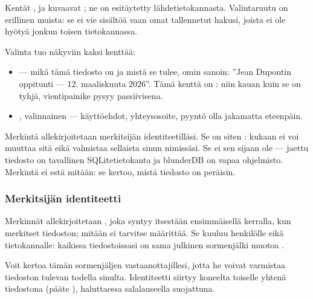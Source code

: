 \documentclass[letterpaper,10pt,finnish]{sphinxmanual}
\begin{document}
\sphinxAtStartPar
Kentät ,  ja  kuvaavat ; ne on esitäytetty lähdetietokannasta. Valintaruutu  on erillinen muista: se ei vie sisältöä vaan omat tallennetut hakusi, joista ei ole hyötyä jonkun toisen tietokannassa.

\sphinxAtStartPar
Valinta  tuo näkyviin kaksi kenttää:
\begin{itemize}
\item {} 
\sphinxAtStartPar
{} — mikä tämä tiedosto on ja mistä se tulee, omin sanoin: ”Jean Dupontin oppitunti — 12. maaliskuuta 2026”. Tämä kenttä on : niin kauan kuin se on tyhjä, vientipainike pysyy passiivisena.

\item {} 
\sphinxAtStartPar
{}, valinnainen — käyttöehdot, yhteysosoite, pyyntö olla jakamatta eteenpäin.

\end{itemize}

\sphinxAtStartPar
Merkintä allekirjoitetaan merkitsijän identiteetilläsi. Se on siten : kukaan ei voi muuttaa sitä eikä valmistaa sellaista sinun nimissäsi. Se ei sen sijaan ole  — jaettu tiedosto on tavallinen SQLite\sphinxhyphen{}tietokanta ja blunderDB on vapaa ohjelmisto. Merkintä ei estä mitään: se kertoo, mistä tiedosto on peräisin.


\subsubsection{Merkitsijän identiteetti}
\label{\detokenize{manuel:identite-d-emetteur}}
\sphinxAtStartPar
Merkinnät allekirjoitetaan , joka syntyy itsestään ensimmäisellä kerralla, kun merkitset tiedoston; mitään ei tarvitse määrittää. Se kuuluu henkilölle eikä tietokannalle: kaikissa tiedostoissasi on sama julkinen sormenjälki muotoa .

\sphinxAtStartPar
Voit kertoa tämän sormenjäljen vastaanottajillesi, jotta he voivat varmistaa tiedoston tulevan todella sinulta. Identiteetti siirtyy koneelta toiselle yhtenä tiedostona (pääte ), haluttaessa salalauseella suojattuna. 
\end{document}
